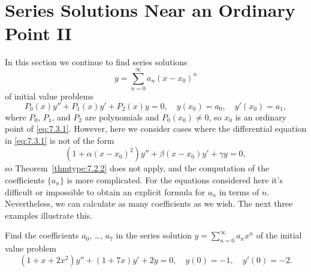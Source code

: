 \section{Series Solutions Near an Ordinary Point II}

\noindent
In this section we continue to find series solutions
\[
  y=\sum_{n=0}^{\infty}a_{n}(x-x_{0})^{n}
\]
of initial value problems
\begin{equation}
  \label{eq:7.3.1}P_{0}(x)y''+P_{1}(x)y'+P_{2}(x)y=0,\quad y(x_{0})=a_{0},\quad y'(x_{0})=a_{1},
\end{equation}
where $P_{0}$, $P_{1}$, and $P_{2}$ are polynomials and $P_{0}(x_{0})\ne0$, so $x_{0}$ is an
ordinary point of \eqref{eq:7.3.1}. However, here we consider cases where the differential equation
in \eqref{eq:7.3.1} is not of the form
\[
  \left(1+\alpha(x-x_{0})^{2}\right)y''+\beta(x-x_{0})y'+\gamma y=0,
\]
so Theorem~\ref{thmtype:7.2.2} does not apply, and the computation of the coefficients $\{a_{n}\}$
is more complicated. For the equations considered here it's difficult or impossible to obtain an
explicit formula for $a_{n}$ in terms of $n$. Nevertheless, we can calculate as many coefficients as
we wish. The next three examples illustrate this.

\begin{example}
  \label{example:7.3.1} \rm Find the coefficients $a_{0}$, \dots, $a_{7}$ in the series solution
  $y=\sum^{\infty}_{n=0}a_{n}x^{n}$ of the initial value problem
  \begin{equation}
    \label{eq:7.3.2}(1+x+2x^{2})y''+(1+7x)y'+2y=0,\quad y(0)=-1,\quad y'(0)=-2.
  \end{equation}
\end{example}

